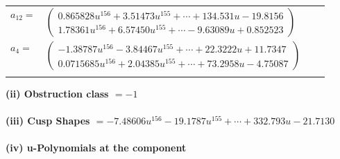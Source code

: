 \documentclass[1p]{elsarticle_modified}
\theoremstyle{definition}
\begin{document}
\begin{tabular}{m{7pt} m{180pt} m{7pt} m{180pt} }
\flushright $a_{12}=$&$\begin{pmatrix}0.865828 u^{156}+3.51473 u^{155}+\cdots+134.531 u-19.8156\\1.78361 u^{156}+6.57450 u^{155}+\cdots-9.63089 u+0.852523\end{pmatrix}$ \\
\flushright $a_{4}=$&$\begin{pmatrix}-1.38787 u^{156}-3.84467 u^{155}+\cdots+22.3222 u+11.7347\\0.0715685 u^{156}+2.04385 u^{155}+\cdots+73.2958 u-4.75087\end{pmatrix}$\\&\end{tabular}
\flushleft \textbf{(ii) Obstruction class $= -1$}\\~\\
\flushleft \textbf{(iii) Cusp Shapes $= -7.48606 u^{156}-19.1787 u^{155}+\cdots+332.793 u-21.7130$}\\~\\
\newpage\renewcommand{\arraystretch}{1}
\flushleft \textbf{(iv) u-Polynomials at the component}\newline \\
\end{document}
